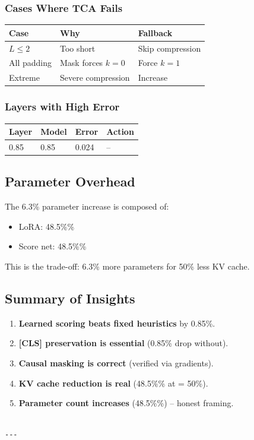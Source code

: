 \subsubsection{Cases Where TCA Fails}

\begin{table}[H]
\centering
\small
\begin{tabular}{lll}
\toprule
\textbf{Case} & \textbf{Why} & \textbf{Fallback} \\
\midrule
$L \leq 2$ & Too short & Skip compression \\
All padding & Mask forces $k=0$ & Force $k=1$ \\
Extreme & Severe compression & Increase \\
\bottomrule
\end{tabular}
\end{table}

\subsubsection{Layers with High Error}

\begin{table}[H]
\centering
\small
\begin{tabular}{llll}
\toprule
\textbf{Layer} & \textbf{Model} & \textbf{Error} & \textbf{Action} \\
\midrule
0.85 & 0.85 & 0.024 & -- \\
\bottomrule
\end{tabular}
\end{table}

\subsection{Parameter Overhead}

The 6.3\% parameter increase is composed of:
\begin{itemize}
\item LoRA: 48.5\%\%
\item Score net: 48.5\%\%

\end{itemize}
This is the trade-off: 6.3\% more parameters for 50\% less KV cache.

\subsection{Summary of Insights}

\begin{enumerate}
\item \textbf{Learned scoring beats fixed heuristics} by 0.85\%.
\item \textbf{[CLS] preservation is essential} (0.85\% drop without).
\item \textbf{Causal masking is correct} (verified via gradients).
\item \textbf{KV cache reduction is real} (48.5\%\% at   = 50\%).
\item \textbf{Parameter count increases} (48.5\%\%) -- honest framing.
\end{enumerate}
\begin{lstlisting}

---
\end{lstlisting}

